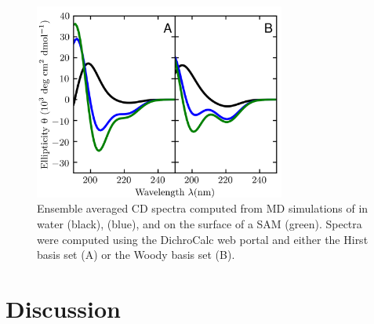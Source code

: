 \begin{figure}
    \center
    \includegraphics[width=3.25in]{figures-helix/combined_cd_spectra.png}
    \caption{
        Ensemble averaged CD spectra computed from MD simulations of \pep{} in water (black), \tbawat{} (blue), and on the surface of a SAM (green). 
        Spectra were computed using the DichroCalc web portal and either the Hirst basis set\cite{Hirst1998, Besley1999} (A) or the Woody basis set\cite{Woody1999} (B).
    }
    \label{fig:helix-avg_cd}
\end{figure}

\section{Discussion}

